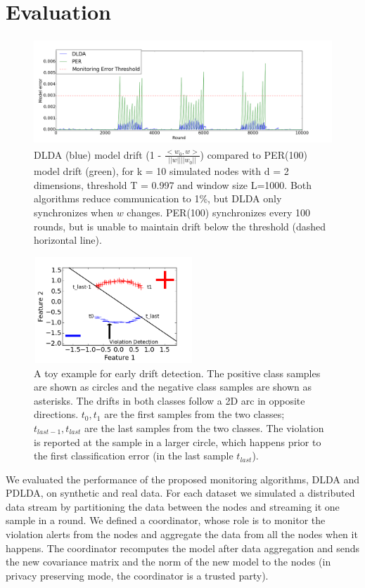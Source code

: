 \documentclass{sig-alternate-05-2015}
\begin{document}
\section{Evaluation}
\begin{figure}[ht]
	\centering
	\includegraphics[width=\textwidth, height=4cm]{PER/PERvsDLDAoverTime.png}
	\caption{ DLDA (blue) model drift (1 - $\frac{<w_0,w>}{||w||||w_0||}$) compared to PER(100) model drift (green),
	for k = 10 simulated nodes with d = 2 dimensions, threshold T = 0.997 and
	window size L=1000. Both algorithms reduce communication to 1\%, but DLDA
	only synchronizes when $w$ changes. PER(100) synchronizes every 100 rounds,
	but is unable to maintain drift below the threshold (dashed horizontal line).}
	\label{PERvsDLDAoverTime}
\end{figure}
\begin{figure}[ht]
	\centering
	\includegraphics[width=60mm,height=4cm]{EarlyDetection.png}
	\caption{A toy example for early drift detection. The positive class samples are shown as circles and the negative class samples are shown as asterisks. The drifts in both classes follow a 2D arc in opposite directions. $t_0, t_1$ are the first samples from the two classes; $t_{last-1}, t_{last}$ are the last samples from the two classes. The violation is reported at the sample in a larger circle, which happens prior to the first classification error (in the  last sample $t_{last}$).}
	\label{EarlyDetection}
\end{figure}
We evaluated the performance of the proposed monitoring algorithms,
DLDA and PDLDA, on synthetic and real
data. For each dataset we simulated a distributed data stream by partitioning the data between the nodes and streaming it one sample in a round. We defined a coordinator, whose role is to monitor the violation alerts from the nodes and aggregate the data from all the nodes when it happens. The coordinator recomputes the model after data aggregation and sends the new covariance matrix and the norm of the new model to the nodes (in privacy preserving mode, the coordinator is a trusted party).
\end{document}
